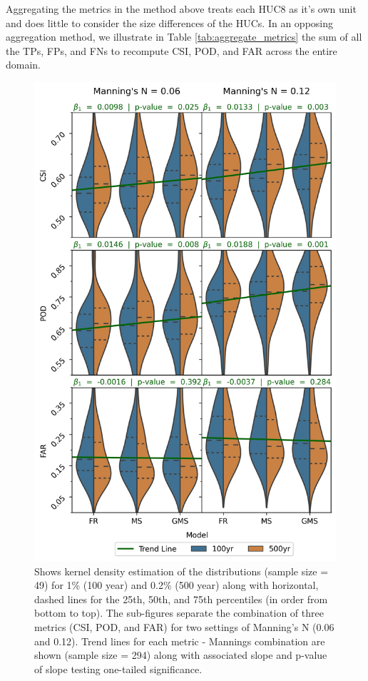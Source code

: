 Aggregating the metrics in the method above treats each HUC8 as it's own unit and does little to consider the size differences of the HUCs. 
In an opposing aggregation method, we illustrate in Table \ref{tab:aggregate_metrics} the sum of all the TPs, FPs, and FNs to recompute CSI, POD, and FAR across the entire domain. 
%
\begin{figure}[h!]
\centering
\includegraphics[scale=0.9]{figures/violin_plots.jpg}
\caption{Shows kernel density estimation of the distributions (sample size = 49) for 1\% (100 year) and 0.2\% (500 year) along with horizontal, dashed lines for the 25th, 50th, and 75th percentiles (in order from bottom to top).
The sub-figures separate the combination of three metrics (CSI, POD, and FAR) for two settings of Manning's N (0.06 and 0.12).
Trend lines for each metric - Mannings combination are shown (sample size = 294) along with associated slope and p-value of slope testing one-tailed significance.}
\label{fig:violin_plot}
\end{figure}
